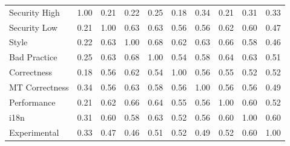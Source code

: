 
\begin{tabular}{lccccccccc}
\hline
Security High & 1.00 & 0.21 & 0.22 & 0.25 & 0.18 & 0.34 & 0.21 & 0.31 & 0.33\\
Security Low & 0.21 & 1.00 & 0.63 & 0.63 & 0.56 & 0.56 & 0.62 & 0.60 & 0.47\\
Style & 0.22 & 0.63 & 1.00 & 0.68 & 0.62 & 0.63 & 0.66 & 0.58 & 0.46\\
Bad Practice & 0.25 & 0.63 & 0.68 & 1.00 & 0.54 & 0.58 & 0.64 & 0.63 & 0.51\\
Correctness & 0.18 & 0.56 & 0.62 & 0.54 & 1.00 & 0.56 & 0.55 & 0.52 & 0.52\\
MT Correctness & 0.34 & 0.56 & 0.63 & 0.58 & 0.56 & 1.00 & 0.56 & 0.56 & 0.49\\
Performance & 0.21 & 0.62 & 0.66 & 0.64 & 0.55 & 0.56 & 1.00 & 0.60 & 0.52\\
i18n & 0.31 & 0.60 & 0.58 & 0.63 & 0.52 & 0.56 & 0.60 & 1.00 & 0.60\\
Experimental & 0.33 & 0.47 & 0.46 & 0.51 & 0.52 & 0.49 & 0.52 & 0.60 & 1.00\\
\hline
\end{tabular}
